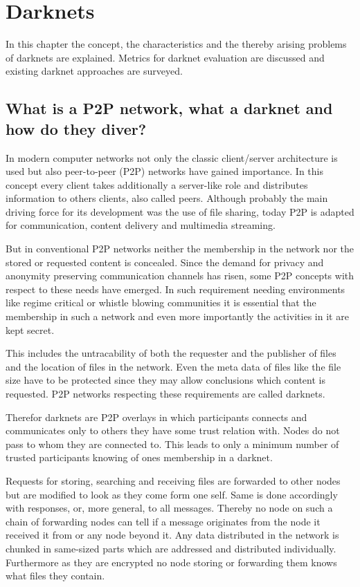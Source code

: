 \chapter{Darknets}

In this chapter the concept, the characteristics and the thereby arising problems of darknets are explained. Metrics for darknet evaluation are discussed and existing darknet approaches are surveyed.

\section{What is a P2P network, what a darknet and how do they diver?}

In modern computer networks not only the classic client/server architecture is used but also peer-to-peer (P2P) networks have gained importance. In this concept every client takes additionally a server-like role and distributes information to others clients, also called peers. Although probably the main driving force for its development was the use of file sharing, today P2P is adapted for communication, content delivery and multimedia streaming.

But in conventional P2P networks neither the membership in the network nor the stored or requested content is concealed. Since the demand for privacy and anonymity preserving communication channels has risen, some P2P concepts with respect to these needs have emerged. In such requirement needing environments like regime critical or whistle blowing communities it is essential that the membership in such a network and even more importantly the activities in it are kept secret.

This includes the untracability of both the requester and the publisher of files and the location of files in the network. Even the meta data of files like the file size have to be protected since they may allow conclusions which content is requested. P2P networks respecting these requirements are called darknets.

Therefor darknets are P2P overlays in which participants connects and communicates only to others they have some trust relation with. Nodes do not pass to whom they are connected to. This leads to only a minimum number of trusted participants knowing of ones membership in a darknet. 

Requests for storing, searching and receiving files are forwarded to other nodes but are modified to look as they come form one self. Same is done accordingly with responses, or, more general, to all messages. Thereby no node on such a chain of forwarding nodes can tell if a message originates from the node it received it from or any node beyond it. Any data distributed in the network is chunked in same-sized parts which are addressed and distributed individually. Furthermore as they are encrypted no node storing or forwarding them knows what files they contain.


